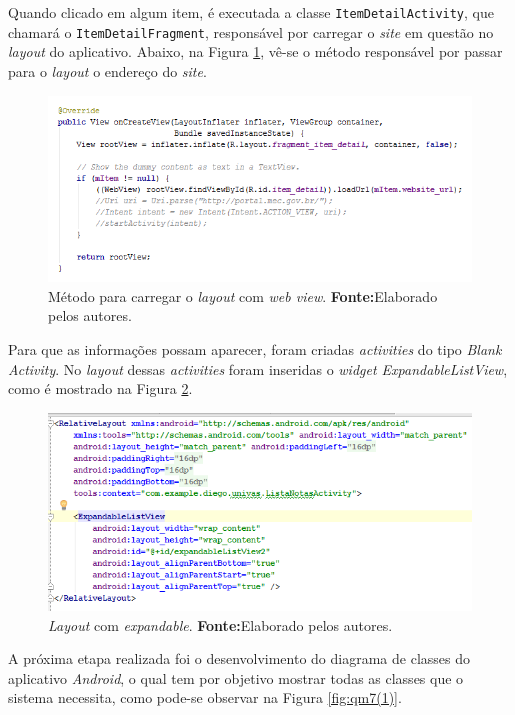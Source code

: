 	\par Quando clicado em algum item, é executada a classe
\texttt{ItemDetailActivity}, que chamará o \texttt{ItemDetailFragment},
responsável por carregar o \textit{site} em questão no \textit{layout} do
aplicativo. Abaixo, na Figura \ref{fig:qm6}, vê-se o método responsável por
passar para o \textit{layout} o endereço do \textit{site}.
				
		\begin{figure}[h!]
			\centerline{\includegraphics[scale=0.5]{./imagens/2_q_metodologico/qm6.png}}
			\caption[Método para carregar o \textit{layout} com \textit{web
			view}]{Método para carregar o \textit{layout} com \textit{web
			view}.
			 \textbf{Fonte:}Elaborado pelos autores.}
			\label{fig:qm6}
		\end{figure}

	\par Para que as informações possam aparecer, foram criadas
\textit{activities} do tipo \textit{Blank Activity}. No \textit{layout} dessas
\textit{activities} foram inseridas o \textit{widget ExpandableListView}, como
	é mostrado na Figura \ref{fig:qm7}.
	

		\begin{figure}[h!]
			\centerline{\includegraphics[scale=0.4]{./imagens/2_q_metodologico/qm7.png}}
			\caption[\textit{Layout} com \textit{expandable}]{\textit{Layout} com
			\textit{expandable}.
			 \textbf{Fonte:}Elaborado pelos autores.}
			\label{fig:qm7}
		\end{figure}		
		\pagebreak
	\par A próxima etapa realizada foi o desenvolvimento do diagrama de classes do
aplicativo \textit{Android}, o qual tem por objetivo mostrar todas as classes
que o sistema necessita, como pode-se observar na Figura \ref{fig:qm7(1)}.
		
